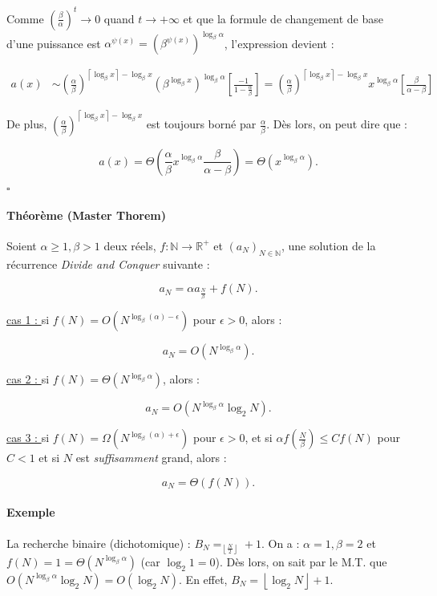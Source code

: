\documentclass{article}
\newcommand{\floor}[1]{{\left\lfloor#1\right\rfloor}}
\newcommand{\ceil}[1]{{\left\lceil#1\right\rceil}}
\begin{document}
			Comme $\left(\frac \beta\alpha\right)^t \to 0$ quand $t \to +\infty$ et que la formule de changement de base d'une puissance est $\alpha^{\psi(x)} = \left(\beta^{\psi(x)}\right)^{\log_\beta \alpha}$,
			l'expression devient :

			\begin{align*}
				a(x) &\sim \left(\frac \alpha\beta\right)^{\ceil{\log_\beta x} - \log_\beta x}\left(\beta^{\log_\beta x}\right)^{\log_\beta \alpha}\left[\frac {-1}{1-\frac \alpha\beta}\right]
				= \left(\frac \alpha\beta\right)^{\ceil{\log_\beta x} - \log_\beta x}x^{\log_\beta \alpha}\left[\frac \beta{\alpha-\beta}\right]
			\end{align*}

			De plus, $\left(\frac \alpha\beta\right)^{\ceil{\log_\beta x} - \log_\beta x}$ est toujours borné par $\frac \alpha\beta$. Dès lors, on peut dire que :

			\[a(x) = \Theta\left(\frac \alpha\beta x^{\log_\beta \alpha}\frac \beta{\alpha-\beta}\right) = \Theta\left(x^{\log_\beta \alpha}\right).\]

			\begin{flushright}$\square$\end{flushright}

			\paragraph{Théorème (Master Thorem)} Soient $\alpha \geq 1, \beta > 1$ deux réels, $f : \mathbb N \to \mathbb R^+$ et $(a_N)_{N\in\mathbb N}$, une solution de la récurrence
			\textit{Divide and Conquer} suivante :

			\[a_N = \alpha a_{\frac N\beta} + f(N).\]

			\underline{cas 1 : } si $f(N) = O\left(N^{\log_\beta(\alpha)-\epsilon}\right)$ pour $\epsilon > 0$, alors :

			\[a_N = O\left(N^{\log_\beta\alpha}\right).\]

			\underline{cas 2 : } si $f(N) = \Theta\left(N^{\log_\beta\alpha}\right)$, alors :

			\[a_N = O\left(N^{\log_\beta\alpha}\log_2 N\right).\]

			\underline{cas 3 : } si $f(N) = \Omega\left(N^{\log_\beta(\alpha) + \epsilon}\right)$ pour $\epsilon > 0$, et si $\alpha f\left(\frac N\beta\right) \leq C f(N)$ pour $C < 1$ et si
			$N$ est \textit{suffisamment} grand, alors :

			\[a_N = \Theta(f(N)).\]

			\paragraph{Exemple} La recherche binaire (dichotomique) : $B_N = _{\floor{\frac N2}} + 1$. On a : $\alpha = 1, \beta = 2$ et $f(N) = 1 = \Theta\left(N^{\log_\beta\alpha}\right)$
			(car $\log_2 1 = 0$). Dès lors, on sait par le M.T. que $O\left(N^{\log_\beta\alpha}\log_2 N\right) = O(\log_2 N)$. En effet, $B_N = \floor{\log_2 N} + 1$.
\end{document}
